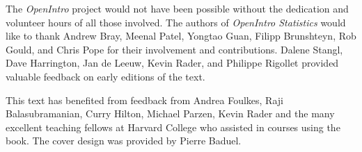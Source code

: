 The \emph{OpenIntro} project would not have been possible without the dedication and volunteer hours of all those involved.  The authors of \textit{OpenIntro Statistics} would like to thank Andrew Bray, Meenal Patel, Yongtao Guan, Filipp Brunshteyn, Rob Gould, and Chris Pope for their involvement and contributions.  Dalene Stangl, Dave Harrington, Jan de Leeuw, Kevin Rader, and Philippe Rigollet provided valuable feedback on early editions of the text.

This text has benefited from feedback from Andrea Foulkes, Raji Balasubramanian, Curry Hilton, Michael Parzen, Kevin Rader and the many excellent teaching fellows at Harvard College who assisted in courses using the book.  The cover design was provided by Pierre Baduel.


